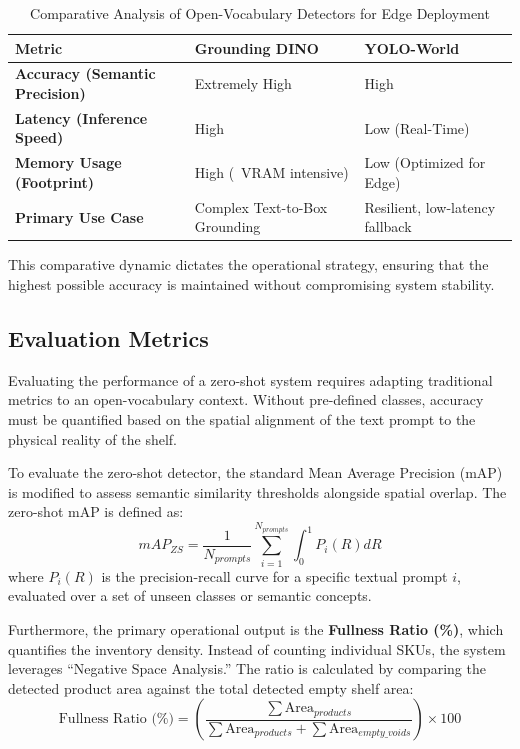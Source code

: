 \begin{table}[h]
\centering
\caption{Comparative Analysis of Open-Vocabulary Detectors for Edge Deployment}
\label{tab:vlm-comparison}
\renewcommand{\arraystretch}{1.2}
\begin{tabular}{|p{}|p{}|p{}|}
\hline
\textbf{Metric} & \textbf{Grounding DINO} & \textbf{YOLO-World} \\
\hline
\textbf{Accuracy (Semantic Precision)} & Extremely High & High \\
\hline
\textbf{Latency (Inference Speed)} & High & Low (Real-Time) \\
\hline
\textbf{Memory Usage (Footprint)} & High (~VRAM intensive) & Low (Optimized for Edge) \\
\hline
\textbf{Primary Use Case} & Complex Text-to-Box Grounding & Resilient, low-latency fallback \\
\hline
\end{tabular}
\end{table}

This comparative dynamic dictates the operational strategy, ensuring that the highest possible accuracy is maintained without compromising system stability.

\subsection{Evaluation Metrics}
Evaluating the performance of a zero-shot system requires adapting traditional metrics to an open-vocabulary context. Without pre-defined classes, accuracy must be quantified based on the spatial alignment of the text prompt to the physical reality of the shelf.

To evaluate the zero-shot detector, the standard Mean Average Precision (mAP) is modified to assess semantic similarity thresholds alongside spatial overlap. The zero-shot mAP is defined as:
\begin{equation}
mAP_{ZS} = \frac{1}{N_{prompts}} \sum_{i=1}^{N_{prompts}} \int_{0}^{1} P_{i}(R) dR
\end{equation}
where $P_{i}(R)$ is the precision-recall curve for a specific textual prompt $i$, evaluated over a set of unseen classes or semantic concepts.

Furthermore, the primary operational output is the \textbf{Fullness Ratio (\%)}, which quantifies the inventory density. Instead of counting individual SKUs, the system leverages ``Negative Space Analysis.'' The ratio is calculated by comparing the detected product area against the total detected empty shelf area:
\begin{equation}
\text{Fullness Ratio (\%)} = \left( \frac{\sum \text{Area}_{products}}{\sum \text{Area}_{products} + \sum \text{Area}_{empty\_voids}} \right) \times 100
\end{equation}

